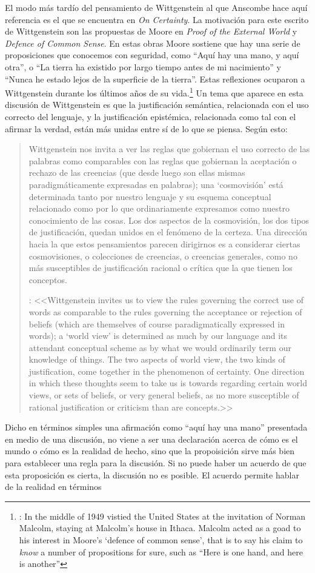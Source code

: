 El modo más tardío del pensamiento de Wittgenstein al que Anscombe hace aquí referencia es el que se encuentra en \emph{On Certainty}. La motivación para este escrito de Wittgenstein son las propuestas de Moore en \emph{Proof of the External World} y \emph{Defence of Common Sense}. En estas obras Moore sostiene que hay una serie de proposiciones que conocemos con seguridad, como \enquote{Aquí hay una mano, y aquí otra}, o \enquote{La tierra ha existido por largo tiempo antes de mi nacimiento} y \enquote{Nunca he estado lejos de la superficie de la tierra}. Estas reflexiones ocuparon a Wittgenstein durante los últimos años de su vida.\footnote{\cite[Cf.~][vi]{wittgenstein1969oncert}: In the middle of 1949  vistied the United States at the invitation of Norman Malcolm, staying at Malcolm's house in Ithaca. Malcolm acted as a goad to his interest in Moore's `defence of common sense', that is to say his claim to \emph{know} a number of propositions for sure, such as ``Here is one hand, and here is another'' \textelp{}} Un tema que aparece en esta discusión de Wittgenstein es que la justificación semántica, relacionada con el uso correcto del lenguaje, y la justificación epistémica, relacionada como tal con el afirmar la verdad, están más unidas entre sí de lo que se piensa. Según esto:\blockquote[{\cite[213]{teichmann2008ans}}: <<Wittgenstein invites us to view the rules governing the correct use of words as comparable to the rules governing the acceptance or rejection of beliefs (which are themselves of course paradigmatically expressed in words); a ‘world view’ is determined as much by our language and its attendant conceptual scheme as by what we would ordinarily term our knowledge of things. The two aspects of world view, the two kinds of justification, come together in the phenomenon of certainty. \textelp{} One direction in which these thoughts seem to take us is towards regarding certain world views, or sets of beliefs, or very general beliefs, as no more susceptible of rational justification or criticism than are concepts.>>]{Wittgenstein nos invita a ver las reglas que gobiernan el uso correcto de las palabras como comparables con las reglas que gobiernan la aceptación o rechazo de las creencias (que desde luego son ellas mismas paradigmáticamente expresadas en palabras); una `cosmovisión' está determinada tanto por nuestro lenguaje y su esquema conceptual relacionado como por lo que ordinariamente expresamos como nuestro conocimiento de las cosas. Los dos aspectos de la cosmovisión, los dos tipos de justificación, quedan unidos en el fenómeno de la certeza. \textelp{} Una dirección hacia la que estos pensamientos parecen dirigirnos es a considerar ciertas cosmovisiones, o colecciones de creencias, o creencias generales, como no más susceptibles de justificación racional o crítica que la que tienen los conceptos.} Dicho en términos simples una afirmación como \enquote{aquí hay una mano} presentada en medio de una discusión, no viene a ser una declaración acerca de cómo es el mundo o cómo es la realidad de hecho, sino que la propoisición sirve más bien para establecer una regla para la discusión. Si no puede haber un acuerdo de que esta proposición es cierta, la discusión no es posible. El acuerdo permite hablar de la realidad en términos 